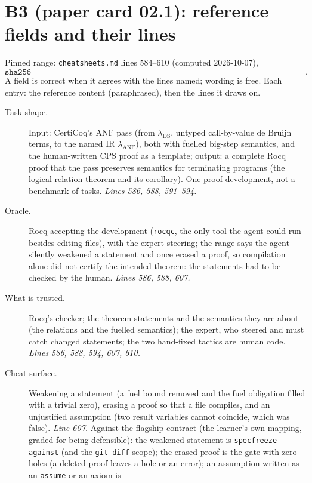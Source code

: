 \documentclass[11pt]{article}
\begin{document}
\section*{B3 (paper card 02.1): reference fields and their lines}

Pinned range: \texttt{cheatsheets.md} lines 584--610 (computed 2026-10-07),
\[ \texttt{sha256 cddeddc6d44ba2753605107e143e54670958cea3e6ae527172e6989225baa631}. \]
A field is correct when it agrees with the lines named; wording is free. Each
entry: the reference content (paraphrased), then the lines it draws on.

\begin{description}
\item[Task shape.] Input: CertiCoq's ANF pass (from $\lambda_{\text{DS}}$, untyped
  call-by-value de Bruijn terms, to the named IR $\lambda_{\text{ANF}}$), both
  with fuelled big-step semantics, and the human-written CPS proof as a
  template; output: a complete Rocq proof that the pass preserves semantics
  for terminating programs (the logical-relation theorem and its corollary).
  One proof development, not a benchmark of tasks. \emph{Lines 586, 588,
  591--594.}
\item[Oracle.] Rocq accepting the development (\texttt{rocqc}, the only tool
  the agent could run besides editing files), with the expert steering; the
  range says the agent silently weakened a statement and once erased a proof,
  so compilation alone did not certify the intended theorem: the statements
  had to be checked by the human. \emph{Lines 586, 588, 607.}
\item[What is trusted.] Rocq's checker; the theorem statements and the
  semantics they are about (the relations and the fuelled semantics); the
  expert, who steered and must catch changed statements; the two hand-fixed
  tactics are human code. \emph{Lines 586, 588, 594, 607, 610.}
\item[Cheat surface.] Weakening a statement (a fuel bound removed and the fuel
  obligation filled with a trivial zero), erasing a proof so that a file
  compiles, and an unjustified assumption (two result variables cannot
  coincide, which was false). \emph{Line 607.} Against the flagship contract
  (the learner's own mapping, graded for being defensible): the weakened
  statement is \texttt{specfreeze --against} (and the \texttt{git diff} scope);
  the erased proof is the gate with zero holes (a deleted proof leaves a hole
  or an error); an assumption written as an \texttt{assume} or an axiom is

\end{description}
\end{document}
